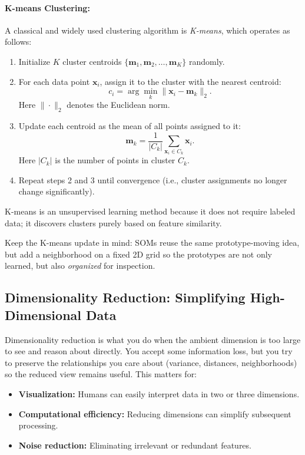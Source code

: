 \paragraph{K-means Clustering:} A classical and widely used clustering algorithm is \emph{K-means}, which operates as follows:
\begin{enumerate}
    \item Initialize $K$ cluster centroids $\{\mathbf{m}_1, \mathbf{m}_2, \ldots, \mathbf{m}_K\}$ randomly.
    \item For each data point $\mathbf{x}_i$, assign it to the cluster with the nearest centroid:
    \[
        c_i = \arg\min_{k} \|\mathbf{x}_i - \mathbf{m}_k\|_2.
    \]
    Here \(\|\cdot\|_2\) denotes the Euclidean norm.
    \item Update each centroid as the mean of all points assigned to it:
    \[
        \mathbf{m}_k = \frac{1}{|C_k|} \sum_{\mathbf{x}_i \in C_k} \mathbf{x}_i.
    \]
    Here \( |C_k| \) is the number of points in cluster \( C_k \).
    \item Repeat steps 2 and 3 until convergence (i.e., cluster assignments no longer change significantly).
\end{enumerate}

K-means is an unsupervised learning method because it does not require labeled data; it discovers clusters purely based on feature similarity.

Keep the K-means update in mind: SOMs reuse the same prototype-moving idea, but add a neighborhood on a fixed 2D grid so the prototypes are not only learned, but also \emph{organized} for inspection.

\subsection{Dimensionality Reduction: Simplifying High-Dimensional Data}
\label{sec:som_dimensionality_reduction_simplifying_high_dimensional_data}

Dimensionality reduction is what you do when the ambient dimension is too large to see and reason about directly. You accept some information loss, but you try to preserve the relationships you care about (variance, distances, neighborhoods) so the reduced view remains useful. This matters for:
\begin{itemize}
    \item \textbf{Visualization:} Humans can easily interpret data in two or three dimensions.
    \item \textbf{Computational efficiency:} Reducing dimensions can simplify subsequent processing.
    \item \textbf{Noise reduction:} Eliminating irrelevant or redundant features.
\end{itemize}


